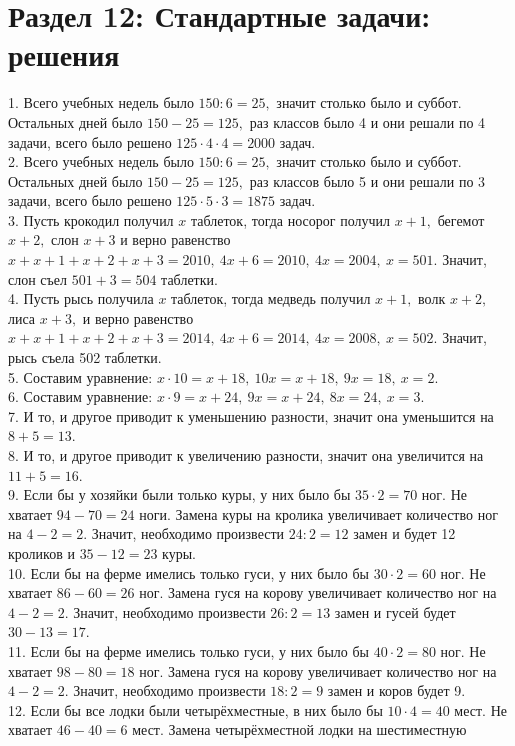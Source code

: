 \documentclass[12pt]{article}
\begin{document}
\section{Раздел 12: Стандартные задачи: решения}
1. Всего учебных недель было $150:6=25,$ значит столько было и суббот. Остальных дней было $150-25=125,$ раз классов было 4 и они решали по 4 задачи, всего было решено $125\cdot4\cdot4=2000$ задач.\\
2. Всего учебных недель было $150:6=25,$ значит столько было и суббот. Остальных дней было $150-25=125,$ раз классов было 5 и они решали по 3 задачи, всего было решено $125\cdot5\cdot3=1875$ задач.\\
3. Пусть крокодил получил $x$ таблеток, тогда носорог получил $x+1,$ бегемот $x+2,$ слон $x+3$ и верно равенство $x+x+1+x+2+x+3=2010,\ 4x+6=2010,\ 4x=2004,\ x=501.$ Значит, слон съел $501+3=504$ таблетки.\\
4. Пусть рысь получила $x$ таблеток, тогда медведь получил $x+1,$ волк $x+2,$ лиса $x+3,$ и верно равенство $x+x+1+x+2+x+3=2014,\ 4x+6=2014,\ 4x=2008,\ x=502.$ Значит, рысь съела 502 таблетки.\\
5. Составим уравнение: $x\cdot10=x+18,\ 10x=x+18,\ 9x=18,\ x=2.$\\
6. Составим уравнение: $x\cdot9=x+24,\ 9x=x+24,\ 8x=24,\ x=3.$\\
7. И то, и другое приводит к уменьшению разности, значит она уменьшится на $8+5=13.$\\
8. И то, и другое приводит к увеличению разности, значит она увеличится на $11+5=16.$\\
9. Если бы у хозяйки были только куры, у них было бы $35\cdot2=70$ ног. Не хватает $94-70=24$ ноги. Замена куры на кролика увеличивает количество ног на $4-2=2.$ Значит, необходимо произвести $24:2=12$ замен и будет 12 кроликов и $35-12=23$ куры.\\
10. Если бы на ферме имелись только гуси, у них было бы  $30\cdot2=60$ ног. Не хватает $86-60=26$ ног. Замена гуся на корову увеличивает количество ног на $4-2=2.$
Значит, необходимо произвести $26:2=13$ замен и гусей будет $30-13=17.$\\
11. Если бы на ферме имелись только гуси, у них было бы  $40\cdot2=80$ ног. Не хватает $98-80=18$ ног. Замена гуся на корову увеличивает количество ног на $4-2=2.$
Значит, необходимо произвести $18:2=9$ замен и коров будет 9.\\
12. Если бы все лодки были четырёхместные, в них было бы $10\cdot4=40$ мест. Не хватает $46-40=6$ мест. Замена четырёхместной лодки на шестиместную
\end{document}
